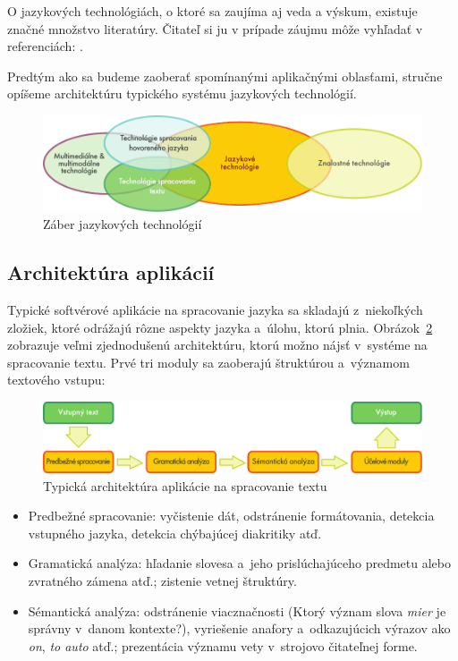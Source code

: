 \begin{multicols}{2}
O jazykových technológiách, o ktoré sa zaujíma aj veda a výskum, existuje značné množstvo literatúry. Čitateľ si ju v prípade záujmu môže vyhľadať v referenciách:  \cite{carstensen-etal1, jurafsky-martin01, manning-schuetze1, lt-world1, lt-survey1}.

Predtým ako sa budeme zaoberať spomínanými aplikačnými oblasťami, stručne opíšeme architektúru typického systému jazykových technológií.

\begin{figure}[ht]
  \center
  \includegraphics[width=\textwidth]{../_media/slovak/language_technologies}
  \caption{Záber jazykových technológií}
  \label{fig:ltincontextsk}
\end{figure}

\subsection{Architektúra aplikácií}
Typické softvérové aplikácie na spracovanie jazyka sa
skladajú z~niekoľkých zložiek, ktoré odrážajú rôzne aspekty
jazyka a~úlohu, ktorú plnia. Obrázok~\ref{fig:textprocessingarch_sk}
zobrazuje veľmi zjednodušenú architektúru, ktorú možno nájsť
v~systéme na spracovanie textu. Prvé tri moduly sa zaoberajú
štruktúrou a~významom textového vstupu:

\begin{figure}[hb]
  \center
  \includegraphics[width=\textwidth]{../_media/slovak/text_processing_app_architecture}
  \caption{Typická architektúra aplikácie na spracovanie textu}
  \label{fig:textprocessingarch_sk}
\end{figure}

\begin{itemize}
\item Predbežné spracovanie: vyčistenie dát, odstránenie formátovania, detekcia vstupného jazyka, detekcia chýbajúcej diakritiky atď.
\item Gramatická analýza: hľadanie slovesa a~jeho prislúchajúceho predmetu alebo zvratného zámena atď.; zistenie vetnej štruktúry.
\item Sémantická analýza: odstránenie viacznačnosti (Ktorý význam slova \emph{mier} je správny v~danom kontexte?), vyriešenie anafory a~odkazujúcich výrazov ako \emph{on}, \emph{to auto} atď.; prezentácia významu vety v~strojovo čitateľnej forme.	
\end{itemize}


\end{multicols}

